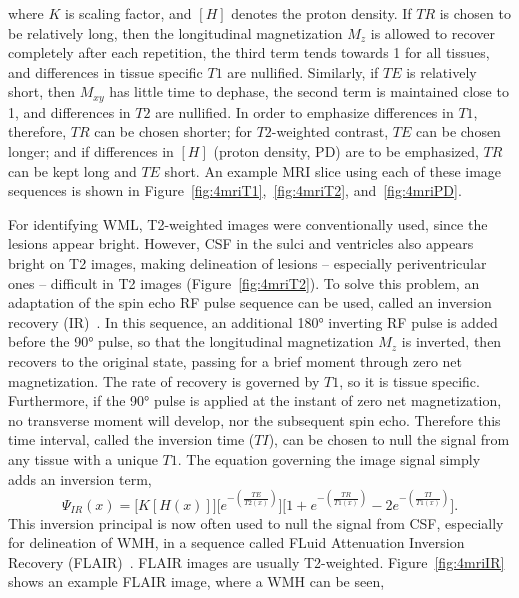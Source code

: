 where $K$ is scaling factor, and $\left[H\right]$ denotes the proton density.
If $TR$ is chosen to be relatively long,
then the longitudinal magnetization $M_z$ is allowed to recover completely after each repetition,
the third term tends towards 1 for all tissues,
and differences in tissue specific $T1$ are nullified.
Similarly, if $TE$ is relatively short,
then $M_{xy}$ has little time to dephase,
the second term is maintained close to 1,
and differences in $T2$ are nullified.
In order to emphasize differences in $T1$, therefore, $TR$ can be chosen shorter;
for $T2$-weighted contrast, $TE$ can be chosen longer;
and if differences in $[H]$ (proton density, PD) are to be emphasized,
$TR$ can be kept long and $TE$ short.
An example MRI slice using each of these image sequences
is shown in Figure~\ref{fig:4mriT1},~\ref{fig:4mriT2}, and~\ref{fig:4mriPD}.
\par
For identifying WML, T2-weighted images were conventionally used, since the lesions appear bright.
However, CSF in the sulci and ventricles also appears bright on T2 images,
making delineation of lesions -- especially periventricular ones --
difficult in T2 images (Figure~\ref{fig:4mriT2}).
To solve this problem, an adaptation of the spin echo RF pulse sequence can be used,
called an inversion recovery (IR)~\cite{Bydder1985}.
In this sequence, an additional \ang{180} inverting RF pulse is added before the
\ang{90} pulse, so that the longitudinal magnetization $M_z$ is inverted,
then recovers to the original state, passing for a brief moment through zero net magnetization.
The rate of recovery is governed by $T1$, so it is tissue specific.
Furthermore, if the \ang{90} pulse is applied at the instant of zero net magnetization,
no transverse moment will develop, nor the subsequent spin echo.
Therefore this time interval, called the inversion time ($TI$),
can be chosen to null the signal from any tissue with a unique $T1$.
The equation governing the image signal simply adds an inversion term,
\begin{equation}\label{eq:MRI-IR}
  \Psi_{IR}(x) = \bigg[K \left[H(x)\right]\bigg]
    \bigg[e^{-\left(\frac{TE}{T2(x)}\right)}\bigg]
    \bigg[1 + e^{-\left(\frac{TR}{T1(x)}\right)} - 2e^{-\left(\frac{TI}{T1(x)}\right)}\bigg].
\end{equation}
This inversion principal is now often used to null the signal from CSF,
especially for delineation of WMH, in a sequence called
FLuid Attenuation Inversion Recovery (FLAIR)~\cite{Hajnal1992}.
FLAIR images are usually T2-weighted.
Figure~\ref{fig:4mriIR} shows an example FLAIR image, where a WMH can be seen,
